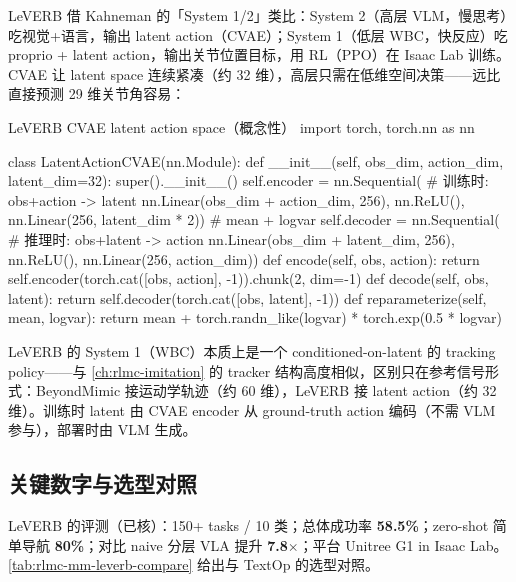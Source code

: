 LeVERB 借 Kahneman 的「System 1/2」类比：System 2（高层 VLM，慢思考）吃视觉+语言，输出 latent action（CVAE）；System 1（低层 WBC，快反应）吃 proprio + latent action，输出关节位置目标，用 RL（PPO）在 Isaac Lab 训练。CVAE 让 latent space 连续紧凑（约 32 维），高层只需在低维空间决策——远比直接预测 29 维关节角容易：

\begin{codebox}[Python]{LeVERB CVAE latent action space（概念性）}
import torch, torch.nn as nn

class LatentActionCVAE(nn.Module):
    def __init__(self, obs_dim, action_dim, latent_dim=32):
        super().__init__()
        self.encoder = nn.Sequential(            # 训练时: obs+action -> latent
            nn.Linear(obs_dim + action_dim, 256), nn.ReLU(),
            nn.Linear(256, latent_dim * 2))      # mean + logvar
        self.decoder = nn.Sequential(            # 推理时: obs+latent -> action
            nn.Linear(obs_dim + latent_dim, 256), nn.ReLU(),
            nn.Linear(256, action_dim))
    def encode(self, obs, action):
        return self.encoder(torch.cat([obs, action], -1)).chunk(2, dim=-1)
    def decode(self, obs, latent):
        return self.decoder(torch.cat([obs, latent], -1))
    def reparameterize(self, mean, logvar):
        return mean + torch.randn_like(logvar) * torch.exp(0.5 * logvar)
\end{codebox}

LeVERB 的 System 1（WBC）本质上是一个 conditioned-on-latent 的 tracking policy——与 \cref{ch:rlmc-imitation} 的 tracker 结构高度相似，区别只在参考信号形式：BeyondMimic 接运动学轨迹（约 60 维），LeVERB 接 latent action（约 32 维）。训练时 latent 由 CVAE encoder 从 ground-truth action 编码（不需 VLM 参与），部署时由 VLM 生成。

\subsection{关键数字与选型对照}
\label{sec:rlmc-mm-leverb-result}

LeVERB 的评测（已核）：150+ tasks / 10 类；总体成功率 \textbf{58.5\%}；zero-shot 简单导航 \textbf{80\%}；对比 naive 分层 VLA 提升 \textbf{7.8$\times$}；平台 Unitree G1 in Isaac Lab。\cref{tab:rlmc-mm-leverb-compare} 给出与 TextOp 的选型对照。

